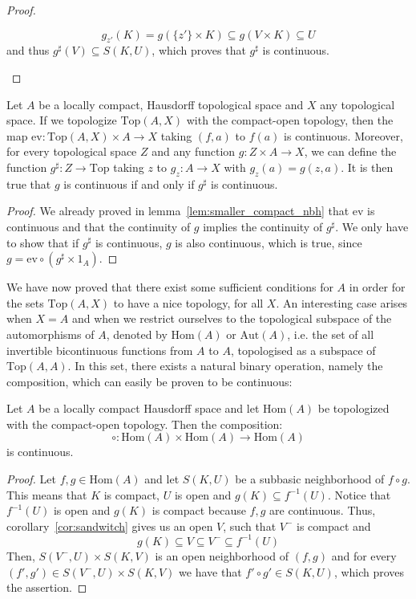 \begin{proof}
\begin{enumerate}
\begin{enumerate}
\[g_{z'}(K)=g(\{z'\}\times K)\subseteq g(V\times K)\subseteq U\]
and thus $g^{\sharp}(V)\subseteq S(K,U)$, which proves that $g^{\sharp}$ is continuous.\qedhere
\end{enumerate}
\end{enumerate}
\end{proof}

\begin{corollary}\label{cor:exp_obj_prop} Let $A$ be a locally compact, Hausdorff topological space and $X$ any topological space. If we topologize $\mathrm{Top}(A,X)$ with the compact-open topology, then the map $\mathrm{ev}:\mathrm{Top}(A,X)\times A\to X$ taking $(f,a)$ to $f(a)$ is continuous. Moreover, for every topological space $Z$ and any function $g:Z\times A\to X$, we can define the function $g^{\sharp}:Z\to\mathrm{Top}$ taking $z$ to $g_z:A\to X$ with $g_z(a)=g(z,a)$. It is then true that $g$ is continuous if and only if $g^{\sharp}$ is continuous.
\end{corollary}
\begin{proof} We already proved in lemma~\ref{lem:smaller_compact_nbh} that $\mathrm{ev}$ is continuous and that the continuity of $g$ implies the continuity of $g^{\sharp}$. We only have to show that if $g^{\sharp}$ is continuous, $g$ is also continuous, which is true, since $g=\mathrm{ev}\circ(g^{\sharp}\times1_A)$.
\end{proof}

We have now proved that there exist some sufficient conditions for $A$ in order for the sets $\mathrm{Top}(A,X)$ to have a nice topology, for all $X$. An interesting case arises when $X=A$ and when we restrict ourselves to the topological subspace of the automorphisms of $A$, denoted by $\mathrm{Hom}(A)$ or $\mathrm{Aut}(A)$, i.e. the set of all invertible bicontinuous functions from $A$ to $A$, topologised as a subspace of $\mathrm{Top}(A,A)$. In this set, there exists a natural binary operation, namely the composition, which can easily be proven to be continuous:
\begin{proposition} Let $A$ be a locally compact Hausdorff space and let $\mathrm{Hom}(A)$ be topologized with the compact-open topology. Then the composition:
\[\circ:\mathrm{Hom}(A)\times\mathrm{Hom}(A)\to\mathrm{Hom}(A)\]
is continuous.
\end{proposition}
\begin{proof} Let $f,g\in\mathrm{Hom}(A)$ and let $S(K,U)$ be a subbasic neighborhood of $f\circ g$. This means that $K$ is compact, $U$ is open and $g(K)\subseteq f^{-1}(U)$. Notice that $f^{-1}(U)$ is open and $g(K)$ is compact because $f,g$ are continuous. Thus, corollary~\ref{cor:sandwitch} gives us an open $V$, such that $V^-$ is compact and
\[g(K)\subseteq V\subseteq V^-\subseteq f^{-1}(U)\]
Then, $S(V^-,U)\times S(K,V)$ is an open neighborhood of $(f,g)$ and for every $(f',g')\in S(V^-,U)\times S(K,V)$ we have that $f'\circ g'\in S(K,U)$, which proves the assertion.
\end{proof}

